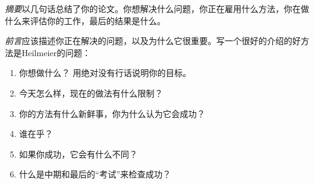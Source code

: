 

\emph{摘要}以几句话总结了你的论文。你想解决什么问题，你正在雇用什么方法，你在做什么来评估你的工作，最后的结果是什么。

\emph{前言}应该描述你正在解决的问题，以及为什么它很重要。写一个很好的介绍的好方法是Heilmeier的问题：

\begin{enumerate}

\item 你想做什么？ 用绝对没有行话说明你的目标。
\item 今天怎么样，现在的做法有什么限制？
\item 你的方法有什么新鲜事，你为什么认为它会成功？
\item 谁在乎？
\item 如果你成功，它会有什么不同？
\item 什么是中期和最后的“考试”来检查成功？
\end{enumerate}



